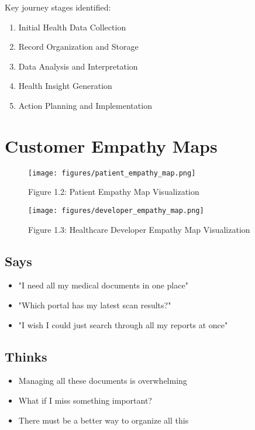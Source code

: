 Key journey stages identified:
\begin{enumerate}
    \item Initial Health Data Collection
    \item Record Organization and Storage
    \item Data Analysis and Interpretation
    \item Health Insight Generation
    \item Action Planning and Implementation
\end{enumerate}

\section{Customer Empathy Maps}

\begin{figure}[H]
    \centering
    \texttt{[image: figures/patient\_empathy\_map.png]}
    \caption{Figure 1.2: Patient Empathy Map Visualization}
\end{figure}

\begin{figure}[H]
    \centering
    \texttt{[image: figures/developer\_empathy\_map.png]}
    \caption{Figure 1.3: Healthcare Developer Empathy Map Visualization}
\end{figure}

\subsection{Says}
\begin{itemize}
    \item "I need all my medical documents in one place"
    \item "Which portal has my latest scan results?"
    \item "I wish I could just search through all my reports at once"
\end{itemize}

\subsection{Thinks}
\begin{itemize}
    \item Managing all these documents is overwhelming
    \item What if I miss something important?
    \item There must be a better way to organize all this
\end{itemize}


